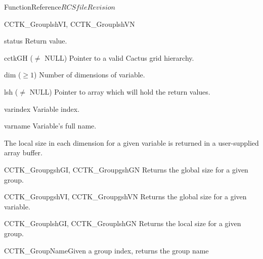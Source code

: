 \begin{cactuspart}{FunctionReference}{$RCSfile$}{$Revision$}
\begin{FunctionDescription}{CCTK\_GrouplshVI, CCTK\_GrouplshVN}
\begin{ParameterSection}
\begin{Parameter}{status} Return value. \end{Parameter}
\begin{Parameter}{cctkGH ($\ne$ NULL)} Pointer to a valid Cactus grid hierarchy. \end{Parameter}
\begin{Parameter}{dim ($\ge 1$)} Number of dimensions of variable. \end{Parameter}
\begin{Parameter}{lsh ($\ne$ NULL)} Pointer to array which will hold the return values. \end{Parameter}
\begin{Parameter}{varindex} Variable index. \end{Parameter}
\begin{Parameter}{varname} Variable's full name. \end{Parameter}
\end{ParameterSection}

\begin{Discussion}
The local size in each dimension for a given variable is returned in a user-supplied array buffer.
\end{Discussion}

\begin{SeeAlsoSection}
\begin{SeeAlso}{CCTK\_GroupgshGI, CCTK\_GroupgshGN}
Returns the global size for a given group.
\end{SeeAlso}
\begin{SeeAlso}{CCTK\_GroupgshVI, CCTK\_GroupgshVN}
Returns the global size for a given variable.
\end{SeeAlso}
\begin{SeeAlso}{CCTK\_GrouplshGI, CCTK\_GrouplshGN}
Returns the local size for a given group.
\end{SeeAlso}
\end{SeeAlsoSection}

\end{FunctionDescription}


\begin{CCTKFunc}{CCTK\_GroupName}{Given a group index, returns the group name}
\label{CCTK-GroupName}
\showcargs
\begin{params}
\end{params}
\begin{discussion}


\end{discussion}
\end{CCTKFunc}
\end{cactuspart}
